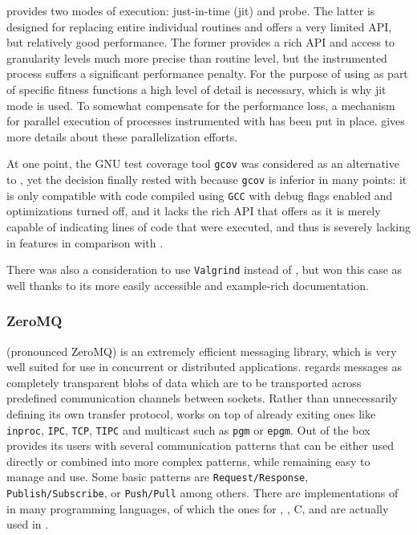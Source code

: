\pin provides two modes of execution: just-in-time (jit) and probe. The latter is designed for replacing
entire individual routines and offers a very limited API, but relatively good performance. The former provides
a rich API and access to granularity levels much more precise than routine level, but the instrumented process
suffers a significant performance penalty. For the purpose of using \pin as part of specific fitness functions
a high level of detail is necessary, which is why jit mode is used. To somewhat compensate for the performance
loss, a mechanism for parallel execution of processes instrumented with \pin has been put in place.
 gives more details about these parallelization efforts.

At one point, the GNU test coverage tool \texttt{gcov}\cite{gcov} was considered as an alternative to 
\pin, yet the decision finally rested with \pin because \texttt{gcov} is inferior in many points: it is only
compatible with code compiled using \texttt{GCC} with debug flags enabled and optimizations turned off,
and it lacks the rich API that \pin offers as it is merely capable of indicating lines of code that were executed, and
thus is severely lacking in features in comparison with \pin.

There was also a consideration to use \texttt{Valgrind}\cite{Nethercote03valgrind:a} instead of \pin, but \pin
won this case as well thanks to its more easily accessible and example-rich documentation. 

\tocless\subsubsection{ZeroMQ}
\label{sec:zmq}
\zmq{}\cite{zmq} (pronounced ZeroMQ) is an extremely efficient messaging library, 
which is very well suited for use in concurrent or distributed applications. \zmq regards messages as 
completely transparent blobs of data which are to be transported across predefined communication channels 
between sockets. Rather than unnecessarily defining its own transfer protocol, \zmq works on top of already exiting 
ones like \texttt{inproc}, \texttt{IPC}, \texttt{TCP}, \texttt{TIPC} and multicast such as \texttt{pgm} or \texttt{epgm}.
Out of the box \zmq provides its users with several communication patterns that can be either used directly or combined 
into more complex patterns, while remaining easy to manage and use. Some basic patterns are
\texttt{Request/Response}, \texttt{Publish/Subscribe}, or \texttt{Push/Pull} among others.
There are implementations of \zmq in many programming languages, of which the ones for \java, \python, C, and
\cpp are actually used in \xmlmate.

